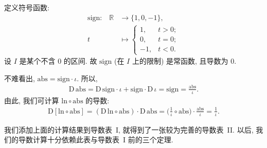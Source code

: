 \begin{example}
    定义符号函数:
    \begin{align*}
        \text{$\mathrm{sign}$:} \quad
        \mathbb{R} & \to \{ 1, 0, -1 \},  \\
        t          & \mapsto \begin{cases}
                                 1,  & t > 0; \\
                                 0,  & t = 0; \\
                                 -1, & t < 0.
                             \end{cases}
    \end{align*}
    设 $I$ 是某个不含 $0$ 的区间.
    故 $\mathrm{sign}$ (在 $I$ 上的限制) 是常函数,
    且导数为 $0$.

    不难看出, $\mathrm{abs} = \mathrm{sign} \cdot \iota$.
    所以,
    \begin{align*}
        \mathrm{D}\, \mathrm{abs} = {\mathrm{D}\, \mathrm{sign}} \cdot \iota + \mathrm{sign} \cdot {\mathrm{D}\, \iota} = \mathrm{sign} = \frac{\mathrm{abs}}{\iota}.
    \end{align*}
    由此, 我们可计算 $\mathrm{ln} \circ \mathrm{abs}$ 的导数:
    \begin{align*}
        \mathrm{D} [\mathrm{ln} \circ \mathrm{abs}] = (\mathrm{D}\, \mathrm{ln} \circ \mathrm{abs}) \cdot \mathrm{D}\, \mathrm{abs} = \bigg(\frac{1}{\iota} \circ \mathrm{abs} \bigg) \cdot \frac{\mathrm{abs}}{\iota} = \frac{1}{\iota}.
    \end{align*}
\end{example}

我们添加上面的计算结果到导数表~I,
就得到了一张较为完善的导数表~II.\@
以后, 我们的导数计算十分依赖此表与导数表~I 前的三个定理.

